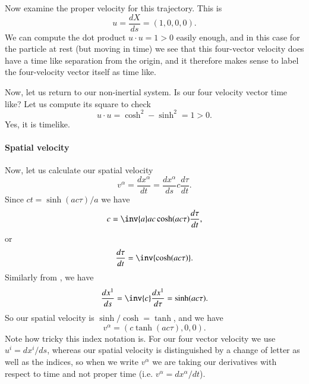 {Now examine the proper velocity for this trajectory.  This is
%
\begin{equation}\label{eqn:relativisticElectrodynamicsT2:72}
u = \frac{dX}{ds} = (1, 0, 0, 0).
\end{equation}
%
We can compute the dot product \(u \cdot u = 1 > 0\) easily enough, and in this case for the particle at rest (but moving in time) we see that this four-vector velocity does have a time like separation from the origin, and it therefore makes sense to label the four-velocity vector itself as time like.

Now, let us return to our non-inertial system.  Is our four velocity vector time like?  Let us compute its square to check
%
\begin{equation}\label{eqn:relativisticElectrodynamicsT2:90}
u \cdot u = \cosh^2 - \sinh^2 = 1 > 0.
\end{equation}
%
Yes, it is timelike.
%
\paragraph{Spatial velocity}

Now, let us calculate our spatial velocity
%
\begin{equation}\label{eqn:relativisticElectrodynamicsT2:100}
v^\alpha
= \frac{dx^\alpha}{dt}
=
\frac{dx^\alpha}{ds} c \frac{d\tau}{dt}.
\end{equation}
%
Since \(ct = \sinh( a c \tau )/a\) we have
%
\begin{equation}\label{eqn:relativisticElectrodynamicsT2:110}
c = \inv{a} a c \cosh( a c \tau ) \frac{d\tau}{dt},
\end{equation}
or
\begin{equation}\label{eqn:relativisticElectrodynamicsT2:110b}
\frac{d\tau}{dt} = \inv{\cosh( a c \tau) }.
\end{equation}
%
Similarly from , we have
%
\begin{equation}\label{eqn:relativisticElectrodynamicsT2:120}
\frac{dx^1}{ds} = \inv{c} \frac{dx^1}{d\tau} = \sinh( a c \tau ).
\end{equation}
%
So our spatial velocity is \(\sinh/\cosh = \tanh\), and we have
%
\begin{equation}\label{eqn:relativisticElectrodynamicsT2:130}
v^\alpha = (c \tanh( a c \tau), 0, 0).
\end{equation}
%
Note how tricky this index notation is.  For our four vector velocity we use \(u^i = dx^i/ds\), whereas our spatial velocity is distinguished by a change of letter as well as the indices, so when we write \(v^\alpha\) we are taking our derivatives with respect to time and not proper time (i.e. \(v^\alpha = dx^\alpha/dt\)).

}
